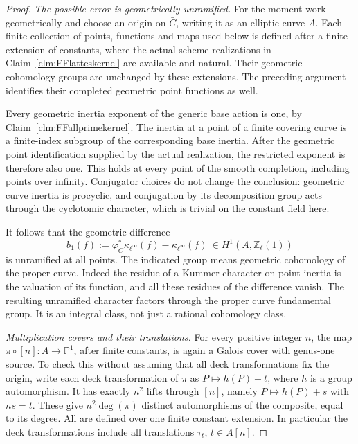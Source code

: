 \begin{proof}
\emph{The possible error is geometrically unramified.}
For the moment work geometrically and choose an
origin on \(\bar C\), writing it as an elliptic
curve \(A\). Each finite collection of points,
functions and maps used below is defined after a
finite extension of constants, where the actual
scheme realizations in
Claim~\ref{clm:FFlatteskernel} are available and
natural. Their geometric cohomology groups are
unchanged by these extensions. The preceding
argument identifies their completed geometric
point functions as well.

Every geometric inertia exponent of the generic
base action is one, by
Claim~\ref{clm:FFallprimekernel}. The inertia at a
point of a finite covering curve is a finite-index
subgroup of the corresponding base inertia. After
the geometric point identification supplied by the
actual realization, the restricted exponent is
therefore also one. This holds at every point of
the smooth completion, including points over
infinity. Conjugator choices do not change the
conclusion: geometric curve inertia is procyclic,
and conjugation by its decomposition group acts
through the cyclotomic character, which is trivial
on the constant field here.

It follows that the geometric difference
\[
 b_1(f):=\varphi_C^*\kappa_{\ell^\infty}(f)
                         -\kappa_{\ell^\infty}(f)
       \ \in H^1(A,\mathbb Z_\ell(1))
                                                        \tag{FF.49.4}
\]
is unramified at all points. The indicated group
means geometric cohomology of the proper curve.
Indeed the residue of a Kummer character on point
inertia is the valuation of its function, and all
these residues of the difference vanish. The
resulting unramified character factors through the
proper curve fundamental group. It is an integral
class, not just a rational cohomology class.

\emph{Multiplication covers and their translations.}
For every positive integer \(n\), the map
\(\pi\circ[n]:A\to\mathbb P^1\), after finite
constants, is again a Galois cover with genus-one
source. To check this without assuming that all
deck transformations fix the origin, write each
deck transformation of \(\pi\) as
\(P\mapsto h(P)+t\), where \(h\) is a group
automorphism. It has exactly \(n^2\) lifts through
\([n]\), namely
\(P\mapsto h(P)+s\) with \(ns=t\). These give
\(n^2\deg(\pi)\) distinct automorphisms of the
composite, equal to its degree. All are defined over
one finite constant extension. In particular the
deck transformations include all translations
\(\tau_t\), \(t\in A[n]\).


\end{proof}
